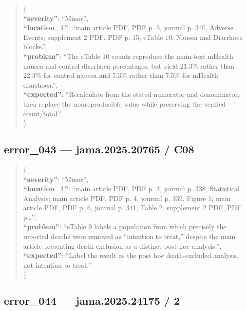 \documentclass[
  letterpaper,
  9pt]{extreport}
\begin{document}
\begin{quote}
\{\\
\textbf{``severity''}: ``Minor'',\\
\textbf{``location\_1''}: ``main article PDF, PDF p. 5, journal p. 340,
Adverse Events; supplement 2 PDF, PDF p. 15, eTable 10, Nausea and
Diarrhoea blocks.'',\\
\textbf{``problem''}: ``The eTable 10 counts reproduce the main-text
mHealth nausea and control diarrhoea percentages, but yield 21.3\%
rather than 22.3\% for control nausea and 7.3\% rather than 7.5\% for
mHealth diarrhoea.'',\\
\textbf{``expected''}: ``Recalculate from the stated numerator and
denominator, then replace the nonreproducible value while preserving the
verified count/total.''\\
\}
\end{quote}

\hypertarget{error_043--jama202520765--c08}{%
\subsection{error\_043 --- jama.2025.20765 /
C08}\label{error_043--jama202520765--c08}}

\begin{quote}
\{\\
\textbf{``severity''}: ``Minor'',\\
\textbf{``location\_1''}: ``main article PDF, PDF p. 3, journal p. 338,
Statistical Analysis; main article PDF, PDF p. 4, journal p. 339, Figure
1; main article PDF, PDF p. 6, journal p. 341, Table 2. supplement 2
PDF, PDF p\ldots{}'',\\
\textbf{``problem''}: ``eTable 9 labels a population from which
precisely the reported deaths were removed as ``intention to treat,''
despite the main article presenting death exclusion as a distinct post
hoc analysis.'',\\
\textbf{``expected''}: ``Label the result as the post hoc death-excluded
analysis, not intention-to-treat.''\\
\}
\end{quote}

\hypertarget{error_044--jama202524175--2}{%
\subsection{error\_044 --- jama.2025.24175 /
2}\label{error_044--jama202524175--2}}
\end{document}
